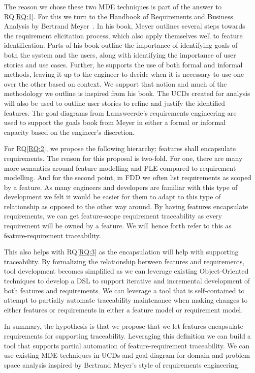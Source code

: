 The reason we chose these two \ac{MDE} techniques is part of the answer to RQ\ref{RQ:1}. For this we turn to the Handbook of Requirements and Business Analysis by Bertrand Meyer~\cite{meyer2022handbook}. In his book, Meyer outlines several steps towards the requirement elicitation process, which also apply themselves well to feature identification. Parts of his book outline the importance of identifying goals of both the system and the users, along with identifying the importance of user stories and use cases. Further, he supports the use of both formal and informal methods, leaving it up to the engineer to decide when it is necessary to use one over the other based on context. We support that notion and much of the methodology we outline is inspired from his book. The \ac{UCD}s created for analysis will also be used to outline user stories to refine and justify the identified features. The goal diagrams from Lamsweerde's requirements engineering are used to support the goals book from Meyer in either a formal or informal capacity based on the engineer's discretion.

For RQ\ref{RQ:2}, we propose the following hierarchy; features shall encapsulate requirements. The reason for this proposal is two-fold. For one, there are many more semantics around feature modelling and \ac{PLE} compared to requirement modelling. And for the second point, in \ac{FDD} we often list requirements as scoped by a feature. As many engineers and developers are familiar with this type of development we felt it would be easier for them to adapt to this type of relationship as opposed to the other way around. By having features encapsulate requirements, we can get feature-scope requirement traceability as every requirement will be owned by a feature. We will hence forth refer to this as feature-requirement traceability.

This also helps with RQ\ref{RQ:3} as the encapsulation will help with supporting traceability. By formalizing the relationship between features and requirements, tool development becomes simplified as we can leverage existing Object-Oriented techniques to develop a \ac{DSL} to support iterative and incremental development of both features and requirements. We can leverage a tool that is self-contained to attempt to partially automate traceability maintenance when making changes to either features or requirements in either a feature model or requirement model.

In summary, the hypothesis is that we propose that we let features encapsulate requirements for supporting traceability. Leveraging this definition we can build a tool that supports partial automation of feature-requirement traceability. We can use existing \ac{MDE} techniques in \ac{UCD}s and goal diagram for domain and problem space analysis inspired by Bertrand Meyer's style of requirements engineering.




